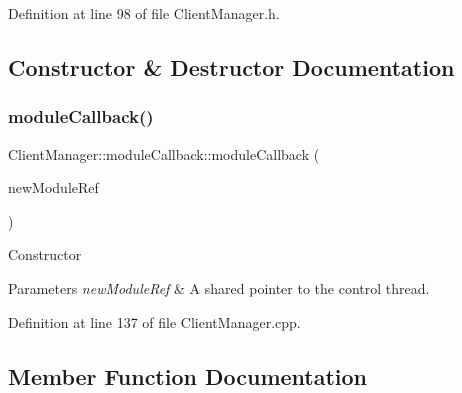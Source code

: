 Definition at line 98 of file Client\+Manager.\+h.



\subsection{Constructor \& Destructor Documentation}
\hypertarget{classocra__recipes_1_1ClientManager_1_1moduleCallback_a9c5241da8148f501d1947053fe06ebdb}{}\label{classocra__recipes_1_1ClientManager_1_1moduleCallback_a9c5241da8148f501d1947053fe06ebdb} 
\subsubsection{\texorpdfstring{module\+Callback()}{moduleCallback()}}
{\footnotesize\ttfamily Client\+Manager\+::module\+Callback\+::module\+Callback (\begin{DoxyParamCaption}\item[{\hyperlink{classocra__recipes_1_1ClientManager}{Client\+Manager} \&}]{new\+Module\+Ref }\end{DoxyParamCaption})}

Constructor 
\begin{DoxyParams}{Parameters}
{\em new\+Module\+Ref} & A shared pointer to the control thread. \\
\hline
\end{DoxyParams}


Definition at line 137 of file Client\+Manager.\+cpp.



\subsection{Member Function Documentation}
\hypertarget{classocra__recipes_1_1ClientManager_1_1moduleCallback_a728d0037e1552bf3ca6152d6b638f30c}{}\label{classocra__recipes_1_1ClientManager_1_1moduleCallback_a728d0037e1552bf3ca6152d6b638f30c} 
